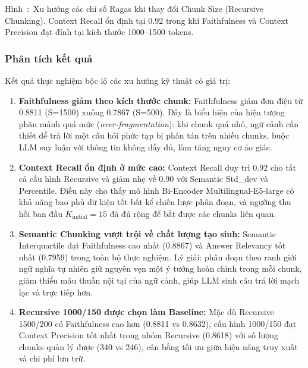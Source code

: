 ﻿\documentclass[12pt]{article}
\newcounter{hinh}
\newcommand{\capfig}[1]{%
  \refstepcounter{hinh}%
    Hình~\thehinh:~#1
}
\begin{document}
\begin{figurecaptionmodern}
\capfig{Xu hướng các chỉ số Ragas khi thay đổi Chunk Size (Recursive Chunking). Context Recall ổn định tại 0.92 trong khi Faithfulness và Context Precision đạt đỉnh tại kích thước 1000--1500 tokens.}
\end{figurecaptionmodern}

\subsubsection{Phân tích kết quả}

Kết quả thực nghiệm bộc lộ các xu hướng kỹ thuật có giá trị:

\begin{enumerate}
    \item \textbf{Faithfulness giảm theo kích thước chunk:} Faithfulness giảm đơn điệu từ 0.8811 (S=1500) xuống 0.7867 (S=500). Đây là biểu hiện của hiện tượng phân mảnh quá mức (\textit{over-fragmentation}): khi chunk quá nhỏ, ngữ cảnh cần thiết để trả lời một câu hỏi phức tạp bị phân tán trên nhiều chunks, buộc LLM suy luận với thông tin không đầy đủ, làm tăng nguy cơ ảo giác.

    \item \textbf{Context Recall ổn định ở mức cao:} Context Recall duy trì 0.92 cho tất cả cấu hình Recursive và giảm nhẹ về 0.90 với Semantic Std\_dev và Percentile. Điều này cho thấy mô hình Bi-Encoder Multilingual-E5-large có khả năng bao phủ dữ kiện tốt bất kể chiến lược phân đoạn, và ngưỡng thu hồi ban đầu $K_{\text{initial}} = 15$ đã đủ rộng để bắt được các chunks liên quan.

    \item \textbf{Semantic Chunking vượt trội về chất lượng tạo sinh:} Semantic Interquartile đạt Faithfulness cao nhất (0.8867) và Answer Relevancy tốt nhất (0.7959) trong toàn bộ thực nghiệm. Lý giải: phân đoạn theo ranh giới ngữ nghĩa tự nhiên giữ nguyên vẹn một ý tưởng hoàn chỉnh trong mỗi chunk, giảm thiểu mâu thuẫn nội tại của ngữ cảnh, giúp LLM sinh câu trả lời mạch lạc và trực tiếp hơn.

    \item \textbf{Recursive 1000/150 được chọn làm Baseline:} Mặc dù Recursive 1500/200 có Faithfulness cao hơn (0.8811 vs 0.8632), cấu hình 1000/150 đạt Context Precision tốt nhất trong nhóm Recursive (0.8618) với số lượng chunks quản lý được (340 vs 246), cân bằng tối ưu giữa hiệu năng truy xuất và chi phí lưu trữ.
\end{enumerate}
\end{document}
